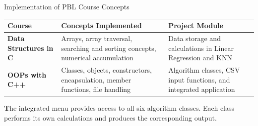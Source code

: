 \documentclass[aspectratio=169,11pt]{beamer}
\begin{document}
\begin{frame}{Implementation of PBL Course Concepts}
\scriptsize
\begin{center}
\renewcommand{\arraystretch}{1.3}
\begin{tabularx}{.96\textwidth}{@{}>{\bfseries}p{2.4cm}X p{2.9cm}@{}}
\toprule
Course & Concepts Implemented & Project Module\\
\midrule
Data Structures in C &
Arrays, array traversal, searching and sorting concepts, numerical accumulation &
Data storage and calculations in Linear Regression and KNN\\
OOPs with C++ &
Classes, objects, constructors, encapsulation, member functions, file handling &
Algorithm classes, CSV input functions, and integrated application\\
\bottomrule
\end{tabularx}
\end{center}

\vspace{3mm}

\begin{center}
\colorbox{GEULightBlue}{\parbox{.88\textwidth}{\centering\footnotesize
\textbf The integrated menu provides access to all six algorithm classes. Each class performs its own calculations and produces the corresponding output.}}
\end{center}
\end{frame}
\end{document}
